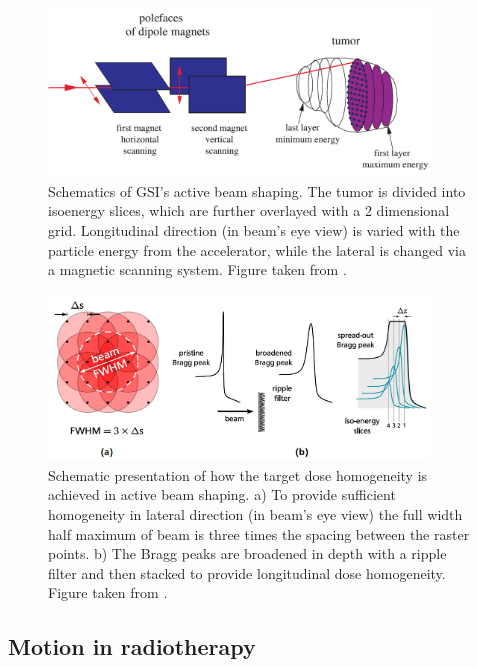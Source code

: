 \begin{figure}[H]
\begin{center}
\includegraphics[width=0.9\textwidth]{./Fundamentals/Images/therapy.png}
\caption{Schematics of GSI's active beam shaping. The tumor is divided into isoenergy slices, which are further overlayed with a 2 dimensional grid. 
Longitudinal direction (in beam's eye view) is varied with the particle energy from the accelerator, while the lateral is changed via a magnetic scanning system. Figure taken from \cite{Kraemer2009}.}
\label{scanning}
\end{center}
\end{figure}


\begin{figure}[H]
\begin{center}
\includegraphics[width=0.9\textwidth]{./Fundamentals/Images/active.png}
\caption{Schematic presentation of how the target dose homogeneity is achieved in active beam shaping. a) To provide sufficient homogeneity in lateral direction (in beam's eye view) the full width
half maximum of beam is three times the spacing between the raster points. b) The Bragg peaks are broadened in depth with a ripple filter and then stacked to provide longitudinal dose homogeneity. 
Figure taken from \cite{Richter2012}.}
\label{active}
\end{center}
\end{figure}


\newpage

\subsection{Motion in radiotherapy}
\label{sec:motion}

